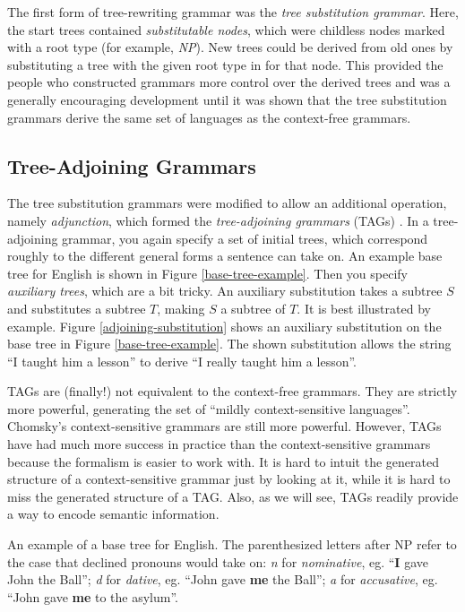 \documentclass[12pt]{article}
\newcommand{\defn}[1]{\textit{#1}}
\begin{document}
The first form of tree-rewriting grammar was the \defn{tree substitution
grammar}.  Here, the start trees contained \defn{substitutable nodes},
which were childless nodes marked with a root type (for example,
\textit{NP}).  New trees could be derived from old ones by substituting
a tree with the given root type in for that node.  This provided the
people who constructed grammars more control over the derived trees and
was a generally encouraging development until it was shown that the tree
substitution grammars derive the same set of languages as the
context-free grammars.

\subsection{Tree-Adjoining Grammars}

The tree substitution grammars were modified to allow an additional
operation, namely \defn{adjunction}, which formed the
\defn{tree-adjoining grammars} (TAGs) \cite{Joshi-1975}.  In a tree-adjoining grammar, you
again specify a set of initial trees, which correspond roughly to the
different general forms a sentence can take on.  An example base tree
for English is shown in Figure \ref{base-tree-example}.  Then you
specify \defn{auxiliary trees}, which are a bit tricky.  An auxiliary
substitution takes a subtree $S$ and substitutes a subtree $T$, making
$S$ a subtree of $T$.  It is best illustrated by example.  Figure
\ref{adjoining-substitution} shows an auxiliary substitution on the base
tree in Figure \ref{base-tree-example}.  The shown substitution allows
the string ``I taught him a lesson'' to derive ``I really taught him a
lesson''.

TAGs are (finally!) not equivalent to the context-free grammars.  They
are strictly more powerful, generating the set of ``mildly
context-sensitive languages''.  Chomsky's context-sensitive grammars are
still more powerful.  However, TAGs have had much more success in
practice than the context-sensitive grammars because the formalism is
easier to work with.  It is hard to intuit the generated structure of a
context-sensitive grammar just by looking at it, while it is hard to
miss the generated structure of a TAG.  Also, as we will see, TAGs
readily provide a way to encode semantic information.

\begin{Figure}
\begin{center}
\end{center}
\caption{An example of a base tree for English.  The parenthesized
letters after NP refer to the case that declined pronouns would take on:
\textit{n} for \defn{nominative}, eg. ``\textbf{I} gave John the
Ball''; \textit{d} for \defn{dative}, eg. ``John gave \textbf{me} the
Ball''; \textit{a} for \defn{accusative}, eg.  ``John gave \textbf{me}
to the asylum''.}
\label{base-tree-example}
\end{Figure}
\end{document}
